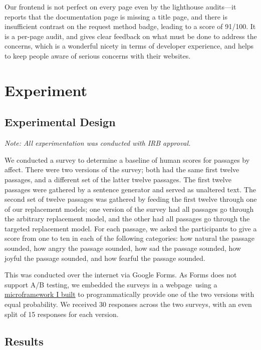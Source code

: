 \documentclass[11pt, twoside, reqno]{book}
\begin{document}
Our frontend is not perfect on every page even by the lighthouse audits—it reports that the documentation page is missing a title page, and there is insufficient contrast on the request method badge, leading to a score of 91/100. It is a per-page audit, and gives clear feedback on what must be done to address the concerns, which is a wonderful nicety in terms of developer experience, and helps to keep people aware of serious concerns with their websites.


\chapter{Experiment}

\section{Experimental Design}

\textit{Note: All experimentation was conducted with IRB approval.}

We conducted a survey to determine a baseline of human scores for passages by affect. There were two versions of the survey; both had the same first twelve passages, and a different set of the latter twelve passages. The first twelve passages were gathered by a sentence generator and served as unaltered text. The second set of twelve passages was gathered by feeding the first twelve through one of our replacement models; one version of the survey had all passages go through the arbitrary replacement model, and the other had all passages go through the targeted replacement model. For each passage, we asked the participants to give a score from one to ten in each of the following categories: how natural the passage sounded, how angry the passage sounded, how sad the passage sounded, how joyful the passage sounded, and how fearful the passage sounded.

This was conducted over the internet via Google Forms. As Forms does not support A/B testing, we embedded the surveys in a webpage using a \href{https://github.com/colehollant/quarantine-js}{microframework I built} to programmatically provide one of the two versions with equal probability. We received 30 responses across the two surveys, with an even split of 15 responses for each version.

\section{Results}
\end{document}
